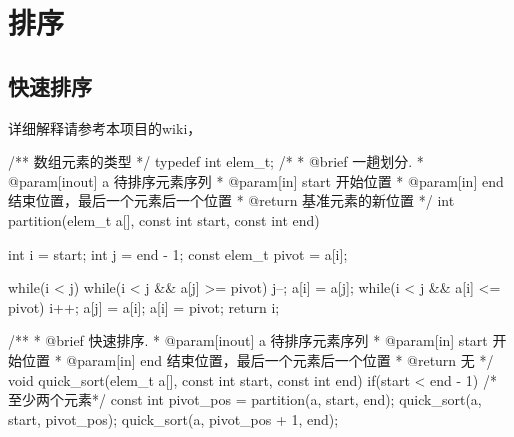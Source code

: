 \chapter{排序}

\section{快速排序} %
详细解释请参考本项目的wiki，

\begin{Codex}[label=quick_sort.c]
/** 数组元素的类型 */
typedef int elem_t;
 /*
  * @brief 一趟划分.
  * @param[inout] a 待排序元素序列
  * @param[in] start 开始位置
  * @param[in] end 结束位置，最后一个元素后一个位置
  * @return 基准元素的新位置
  */
int partition(elem_t a[], const int start, const int end) {
    int i = start;
    int j = end - 1;
    const elem_t pivot = a[i];

    while(i < j) {
        while(i < j && a[j] >= pivot) j--;
        a[i] = a[j];
        while(i < j && a[i] <= pivot) i++;
        a[j] = a[i];
    }
    a[i] = pivot;
    return i;
}

/**
  * @brief 快速排序.
  * @param[inout] a 待排序元素序列
  * @param[in] start 开始位置
  * @param[in] end 结束位置，最后一个元素后一个位置
  * @return 无
  */
void quick_sort(elem_t a[], const int start, const int end) {
    if(start < end - 1) { /* 至少两个元素*/
        const int pivot_pos = partition(a, start, end);
        quick_sort(a, start, pivot_pos);
        quick_sort(a, pivot_pos + 1, end);
    }
}
\end{Codex}